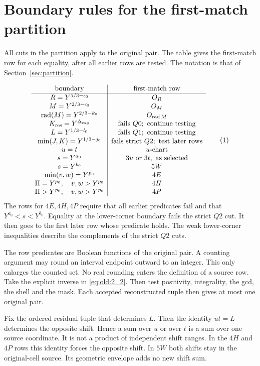 \section{Boundary rules for the first-match partition}\label{app:equality}
\begin{samepage}
All cuts in the partition apply to the original pair. The table gives
the first-match row for each equality, after all earlier rows are tested.
The notation is that of Section~\ref{sec:partition}.
\end{samepage}
\[
\begin{array}{c|c}
\text{boundary}&\text{first-match row}\\ \hline
R=Y^{5/3-\epsilon_0}&O_R\\
M=Y^{2/3-\epsilon_0}&O_M\\
\rad(M)=Y^{2/3-k_0}&O_{\rad M}\\
K_{\rm res}=Y^{\Delta_{\rm exp}}&\text{fails }Q0;\text{ continue testing}\\
L=Y^{1/3-l_0}&\text{fails }Q1;\text{ continue testing}\\
\min(J,K)=Y^{1/3-j_0}&\text{fails strict }Q2;\text{ test later rows}\\
u=t&u\text{-chart}\\
s=Y^{a_0}&3u\text{ or }3t,\text{ as selected}\\
s=Y^{b_0}&5W\\
\min(v,w)=Y^{p_0}&4E\\
\Pi=Y^{p_0},\quad v,w>Y^{p_0}&4H\\
\Pi>Y^{p_0},\quad v,w>Y^{p_0}&4P\\
\end{array}
\AutoTag{eq:old:A_1}
\]
The rows for \(4E,4H,4P\) require that all earlier predicates fail and
that \(Y^{a_0}<s<Y^{b_0}\). Equality at the lower-corner boundary fails the
strict \(Q2\) cut. It then goes to the first later row whose predicate
holds. The weak lower-corner inequalities describe the complements of the
strict \(Q2\) cuts.

The row predicates are Boolean functions of the original pair. A
counting argument may round an interval endpoint outward to an integer.
This only enlarges the counted set. No real rounding enters the
definition of a source row. Take the explicit inverse in
\eqref{eq:old:2_2}. Then test positivity, integrality, the gcd, the shell
and the mask. Each accepted reconstructed tuple then gives at most one
original pair.

Fix the ordered residual tuple that determines \(L\). Then the
identity \(ut=L\) determines the opposite shift. Hence a sum over \(u\) or
over \(t\) is a sum over one source coordinate. It is not a product
of independent shift ranges. In the \(4H\) and \(4P\) rows this identity
forces the opposite shift. In \(5W\) both shifts stay in the
original-cell source. Its geometric envelope adds no new shift sum.

